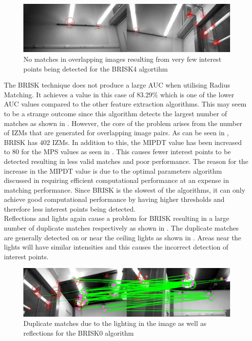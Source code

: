 \documentclass[11pt]{report}
\begin{document}
\begin{figure}
  \centering
    \includegraphics[width=1.0\textwidth]{../Drawings/Matching/noMatchesBrisk4.jpg}
    \caption{No matches in overlapping images resulting from very few interest points being detected for the BRISK4 algortihm }
    \label{fig:noMatchesBrisk4}
\end{figure}

The BRISK technique does not produce a large AUC when utilising Radius Matching. It achieves a  value in this case of $83.29\%$ which is one of the lower AUC values compared to the other feature extraction algorithms. This may seem to be a strange outcome since this algorithm detects the largest number of matches as shown in . However, the core of the problem arises from the number of IZMs that are generated for overlapping image pairs. As can be seen in , BRISK has $402$ IZMs. In addition to this, the MIPDT value has been increased to $80$ for the MPS values as seen in . This causes fewer interest points to be detected resulting in less valid matches and poor performance. The reason for the increase in the MIPDT value is due to the optimal parameters algorithm discussed in  requiring efficient computational performance at an expense in matching performance. Since BRISK is the slowest of the algorithms, it can only achieve good computational performance by having higher thresholds and therefore less interest points being detected.\\

Reflections and lights again cause a problem for BRISK resulting in a large number of duplicate matches respectively as shown in . The duplicate matches are generally detected on or near the ceiling lights as shown in . Areas near the lights will have similar intensities and this causes the incorrect detection of interest points.\\

\begin{figure}
  \centering
    \includegraphics[width=1.0\textwidth]{../Drawings/problems/Reflections.jpg}
    \caption{Duplicate matches due to the lighting in the image as well as reflections for the BRISK0 algorithm} 
    \label{fig:duplicateMatchesBrisk}
\end{figure}
\end{document}
